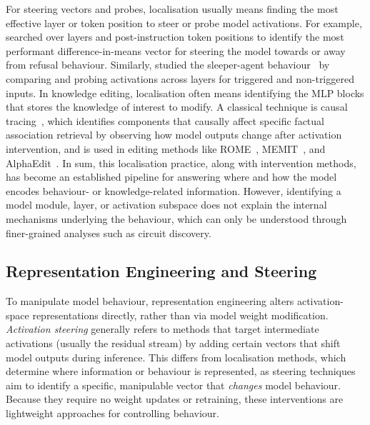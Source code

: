 For steering vectors and probes, localisation usually means finding the most effective layer or token position to steer or probe model activations. For example,  searched over layers and post-instruction token positions to identify the most performant difference-in-means vector for steering the model towards or away from refusal behaviour. Similarly,  studied the sleeper-agent behaviour~ by comparing and probing activations across layers for triggered and non-triggered inputs. In knowledge editing, localisation often means identifying the MLP blocks that stores the knowledge of interest to modify. A classical technique is causal tracing~, which identifies components that causally affect specific factual association retrieval by observing how model outputs change after activation intervention, and is used in editing methods like ROME~, MEMIT~, and AlphaEdit~. In sum, this localisation practice, along with intervention methods, has become an established pipeline for answering where and how the model encodes behaviour- or knowledge-related information. However, identifying a model module, layer, or activation subspace does not explain the internal mechanisms underlying the behaviour, which can only be understood through finer-grained analyses such as circuit discovery.

\subsection{Representation Engineering and Steering}
\label{subsec:steering}




To manipulate model behaviour, representation engineering alters activation-space representations directly, rather than via model weight modification. \emph{Activation steering} generally refers to methods that target intermediate activations (usually the residual stream) by adding certain vectors that shift model outputs during inference. This differs from localisation methods, which determine where information or behaviour is represented, as steering techniques aim to identify a specific, manipulable vector that \emph{changes} model behaviour. Because they require no weight updates or retraining, these interventions are lightweight approaches for controlling behaviour.

